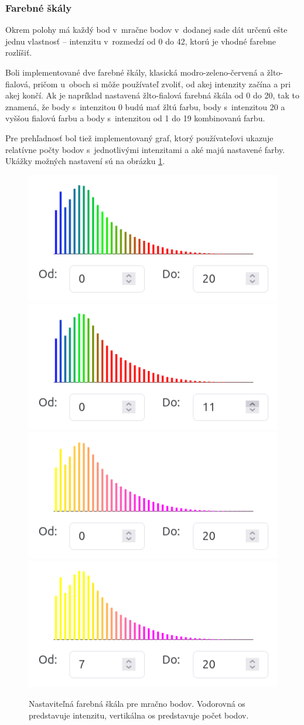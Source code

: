 \subsubsection{Farebné škály}

Okrem polohy má každý bod v~mračne bodov v~dodanej sade dát určenú ešte jednu vlastnosť -- intenzitu v~rozmedzí od 0 do 42, ktorú je vhodné farebne rozlíšiť.

Boli implementované dve farebné škály, klasická modro-zeleno-červená a žlto-fialová, pričom u~oboch si môže používateľ zvoliť, od akej intenzity začína a pri akej končí. Ak je napríklad nastavená žlto-fialová farebná škála od 0 do 20, tak to znamená, že body s~intenzitou 0 budú mať žltú farbu, body s~intenzitou 20 a vyššou fialovú farbu a body s~intenzitou od 1 do 19 kombinovanú farbu.

Pre prehľadnosť bol tiež implementovaný graf, ktorý používateľovi ukazuje relatívne počty bodov s~jednotlivými intenzitami a aké majú nastavené farby. Ukážky možných nastavení sú na obrázku \ref{fig:farebna_skala}.

\begin{figure}[h]
    \centering
    \includegraphics[width=0.35\linewidth]{text_prace/obrazky-figures/farebna_skala1.png}
    \includegraphics[width=0.35\linewidth]{text_prace/obrazky-figures/farebna_skala2.png}
    \includegraphics[width=0.35\linewidth]{text_prace/obrazky-figures/farebna_skala3.png}
    \includegraphics[width=0.35\linewidth]{text_prace/obrazky-figures/farebna_skala4.png}
    \caption[Nastaviteľná farebná škála pre mračno bodov.]{Nastaviteľná farebná škála pre mračno bodov. Vodorovná os predstavuje intenzitu, vertikálna os predstavuje počet bodov.}
    \label{fig:farebna_skala}
\end{figure}

